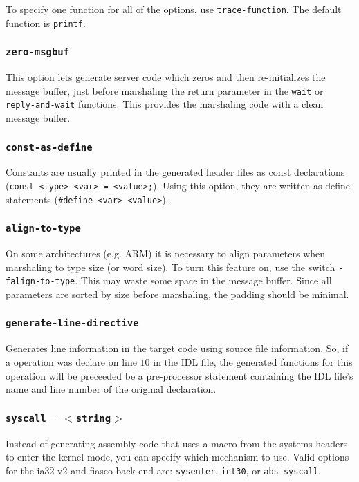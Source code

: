 To specify one function for all of the options, use {\tt trace-function}.
The default function is \verb|printf|.

\subsubsection{{\tt zero-msgbuf}}
This option lets \dice{} generate server code which zeros and then
re-initializes the message buffer, just before marshaling the return parameter
in the \verb|wait| or
\verb|reply-and-wait| functions. This provides
the marshaling code with a clean message buffer.

\subsubsection{\tt const-as-define}
Constants are usually printed in the generated header files as const
declarations (\verb|const <type> <var> = <value>;|). Using this option,
they are written as define statements (\verb|#define <var> <value>|).

\subsubsection{\tt align-to-type}
On some architectures (e.g. ARM) it is necessary to align parameters
when marshaling to type size (or word size). To turn this feature on,
use the switch \verb|-falign-to-type|. This may waste some space in the
message buffer. Since all parameters are sorted by size before marshaling,
the padding should be minimal.

\subsubsection{\tt generate-line-directive}
Generates line information in the target code using source file
information.  So, if a operation was declare on line $10$ in the
IDL file, the generated functions for this operation will be preceeded
be a pre-processor statement containing the IDL file's name and
line number of the original declaration.

\subsubsection{\tt syscall$=<$string$>$}
Instead of generating assembly code that uses a macro from the systems headers
to enter the kernel mode, you can specify which mechanism to use. Valid
options for the ia32 v2 and fiasco back-end are: {\tt sysenter}, {\tt int30},
or {\tt abs-syscall}.

